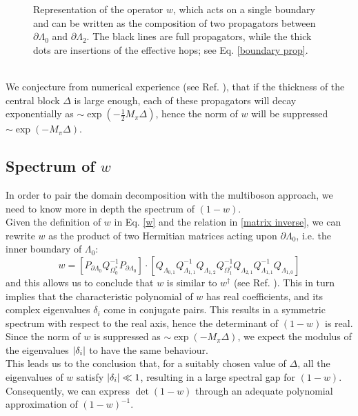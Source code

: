 \begin{figure}

    \caption{Representation of the operator $w$, which acts on a single boundary and can be written as the composition of two propagators between $\partial\Lambda_0$ and $\partial \Lambda_2$. The black lines are full propagators, while the thick dots are insertions of the effective hops; see Eq. \eqref{boundary prop}.}
    \label{fig: op w}
\end{figure}
\\ We conjecture from numerical experience (see Ref. \cite{C__2016}), that if the thickness of the central block $\Delta$ is large enough, each of these propagators will decay exponentially as $\sim \exp(-\frac{1}{2} M_\pi \Delta)$, hence the norm of $w$ will be suppressed $\sim \exp(-M_\pi \Delta)$.

\subsection{Spectrum of $w$}
In order to pair the domain decomposition with the multiboson approach, we need to know more in depth the spectrum of $(1 - w)$.
\\ Given the definition of $w$ in Eq. \eqref{w} and the relation in \eqref{matrix inverse}, we can rewrite $w$ as the product of two Hermitian matrices acting upon $\partial \Lambda_0$, i.e. the inner boundary of $\Lambda_0$:
\begin{equation}
    w = \left[P_{\partial\Lambda_0} Q^{-1}_{\Omega^*_0} P_{\partial\Lambda_0}\right] \cdot \left[ Q_{\Lambda_{0,1}} Q_{\Lambda_{1,1}}^{-1} Q_{\Lambda_{1,2}} Q^{-1}_{\Omega^*_1} Q_{\Lambda_{2,1}} Q_{\Lambda_{1,1}}^{-1} Q_{\Lambda_{1,0}} \right]
\end{equation}
and this allows us to conclude that $w$ is similar to $w^{\dagger}$ (see Ref. \cite{10.2307/2042048}). This in turn implies that the characteristic polynomial of $w$ has real coefficients, and its complex eigenvalues $\delta_i$ come in conjugate pairs. This results in a symmetric spectrum with respect to the real axis, hence the determinant of $(1 - w)$ is real. Since the norm of $w$ is suppressed as $\sim \exp(-M_\pi \Delta)$, we expect the modulus of the eigenvalues $\abs{\delta_i}$ to have the same behaviour.
\\ This leads us to the conclusion that, for a suitably chosen value of $\Delta$, all the eigenvalues of $w$ satisfy $\abs{\delta_i} \ll 1$, resulting in a large spectral gap for $(1 - w)$.
 Consequently, we can express $\det(1-w)$ through an adequate polynomial approximation of $(1 - w)^{-1}.$

